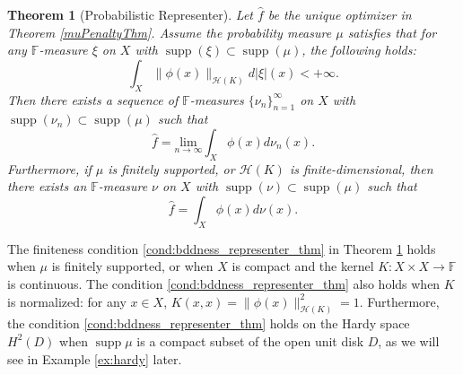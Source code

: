 \documentclass{amsart}
\numberwithin{equation}{section}
\DeclareMathOperator{\supp}{supp}
\theoremstyle{plain}
\newtheorem{theorem}[subsection]{Theorem}
\theoremstyle{remark}
\theoremstyle{definition}
\begin{document}
\begin{theorem}[Probabilistic Representer]\label{GRepresenter1}
 Let $\hat{f}$ be the unique optimizer in Theorem \ref{muPenaltyThm}. 
 Assume the probability measure $\mu$ satisfies that for any $\mathbb{F}$-measure $\xi$ on $X$ with $\supp (\xi) \subset \supp(\mu)$, the following holds: 
\begin{equation}\label{cond:bddness_representer_thm}
    \int_X \|\phi(x)\|_{\mathscr{H}(K)}d|\xi|(x)<+\infty.
\end{equation}
Then there exists a sequence of $\mathbb{F}$-measures $\{\nu_n\}_{n=1}^{\infty}$ on $X$ with  $\supp(\nu_n) \subset \supp(\mu)$ such that 
\begin{equation*}
    \hat{f} = \underset{n \rightarrow \infty}{\text{lim}}\int_{X} \phi(x) d\nu_n(x).
\end{equation*} 
Furthermore, if $\mu$ is finitely supported, or $\mathscr{H}(K)$ is finite-dimensional, then there exists an $\mathbb{F}$-measure $\nu$ on $X$ with  $\supp(\nu) \subset \supp(\mu)$ such that 
\begin{equation*}
    \hat{f} = \int_{X} \phi(x) d\nu(x).
\end{equation*} 
\end{theorem}

The finiteness condition \ref{cond:bddness_representer_thm} in Theorem \ref{GRepresenter1} holds when $\mu$ is finitely supported, or when $X$ is compact and the kernel $K: X \times X \rightarrow \mathbb{F}$ is continuous. The condition \ref{cond:bddness_representer_thm} also holds when $K$ is normalized: for any $x \in X$, $K(x, x) = \|\phi(x)\|_{\mathscr{H}(K)}^2 =1$.
Furthermore, the condition \ref{cond:bddness_representer_thm} holds on the Hardy space $H^2(D)$ when $\supp \mu$ is a compact subset of the open unit disk $D$, as we will see in Example \ref{ex:hardy} later.
\end{document}
